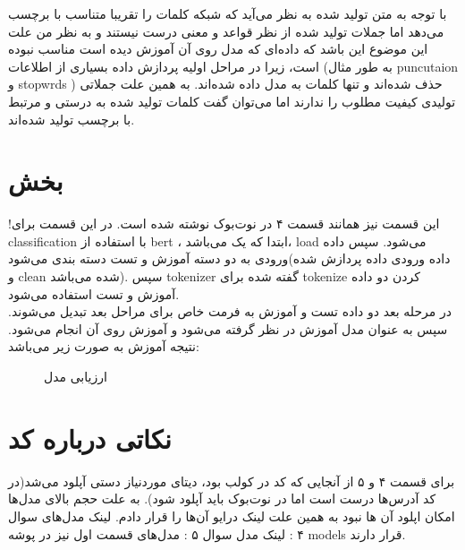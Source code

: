 \documentclass[a4paper]{article}
\begin{document}
با توجه به متن تولید شده به نظر می‌آید که شبکه کلمات را تقریبا متناسب با برچسب می‌دهد اما جملات تولید شده از نظر قواعد و معنی درست نیستند و به نظر من علت این موضوع این باشد که داده‌ای که مدل روی آن آموزش دیده است مناسب نبوده است، زیرا در مراحل اولیه پردازش داده بسیاری از اطلاعات (به طور مثال puncutaion و stopwrds ) حذف شده‌اند و تنها کلمات به مدل داده شده‌اند. به همین علت جملاتی تولیدی کیفیت مطلوب را ندارند اما می‌توان گفت کلمات تولید شده به درستی و مرتبط با برچسب تولید شده‌اند.
\section{بخش }
!این قسمت نیز همانند قسمت ۴ در نوت‌بوک نوشته شده است.
در این قسمت برای classification با استفاده از bert ، ابتدا  که یک  می‌باشد، load می‌شود.
\newline
سپس داده ورودی به دو دسته آموزش و تست دسته بندی می‌شود(داده ورودی داده پردازش شده و clean شده می‌باشد). سپس tokenizer گفته شده برای tokenize کردن دو داده آموزش و تست استفاده می‌شود.
\\
در مرحله بعد دو داده تست و آموزش به فرمت خاص برای مراحل بعد تبدیل می‌شوند. سپس  به عنوان مدل آموزش در نظر گرفته می‌شود و آموزش روی آن انجام می‌شود. نتیجه آموزش به صورت زیر می‌باشد:
\begin{figure}[h!]
\caption{ارزیابی مدل}
\label{f1}
\end{figure}
\vspace{10mm}
\section{نکاتی درباره کد}
برای قسمت ۴ و ۵ از آنجایی که کد در کولب بود، دیتای موردنیاز دستی آپلود می‌شد(در کد  آدرس‌ها درست است اما در نوت‌بوک باید آپلود شود).
به علت حجم بالای مدل‌ها امکان اپلود آن ها نبود به همین علت لینک درایو آن‌ها را قرار دادم.
\newline
لینک مدل‌های سوال ۴ : 
\newline
لینک مدل سوال ۵ :  
\newline
مدل‌های قسمت اول نیز در پوشه models قرار دارند.
\newpage
\end{document}
